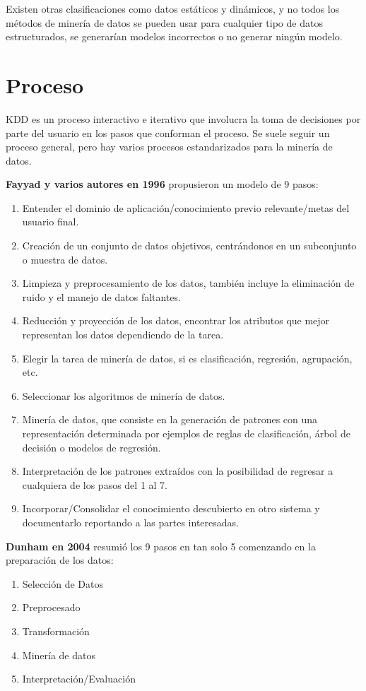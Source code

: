 \documentclass[12pt, twoside, openright]{report} %
\begin{document}
Existen otras clasificaciones como datos estáticos y dinámicos, y no todos los métodos de minería de datos se pueden usar para cualquier tipo de datos estructurados, se generarían modelos incorrectos o no generar ningún modelo.

\section{Proceso}
KDD es un proceso interactivo e iterativo que involucra la toma de decisiones por parte del usuario en los pasos que conforman el proceso. Se suele seguir un proceso general, pero hay varios procesos estandarizados para la minería de datos.

\textbf{Fayyad y varios autores en 1996} propusieron un modelo de 9 pasos:
\begin{enumerate}
	\item Entender el dominio de aplicación/conocimiento previo relevante/metas del usuario final.
	\item Creación de un conjunto de datos objetivos, centrándonos en un subconjunto o muestra de datos.
	\item Limpieza y preprocesamiento de los datos, también incluye la eliminación de ruido y el manejo de datos faltantes.
	\item Reducción y proyección de los datos, encontrar los atributos que mejor representan los datos dependiendo de la tarea.
	\item Elegir la tarea de minería de datos, si es clasificación, regresión, agrupación, etc.
	\item Seleccionar los algoritmos de minería de datos.
	\item Minería de datos, que consiste en la generación de patrones  con una representación determinada por ejemplos de reglas de clasificación, árbol de decisión o modelos de regresión.
	\item Interpretación de los patrones extraídos con la posibilidad de regresar a cualquiera de los pasos del 1 al 7.
	\item Incorporar/Consolidar el conocimiento descubierto en otro sistema y documentarlo reportando a las partes interesadas.
\end{enumerate}

\textbf{Dunham en 2004} resumió los 9 pasos en tan solo 5 comenzando en la preparación de los datos:
\begin{enumerate}
	\item Selección de Datos
	\item Preprocesado
	\item Transformación
	\item Minería de datos
	\item Interpretación/Evaluación
\end{enumerate}
\end{document}

